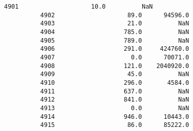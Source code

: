 \documentclass[11pt]{article}
\begin{document}
\begin{Verbatim}[commandchars=\\\{\}]
          4901                    10.0          NaN   
          4902                    89.0      94596.0   
          4903                    21.0          NaN   
          4904                   785.0          NaN   
          4905                   789.0          NaN   
          4906                   291.0     424760.0   
          4907                     0.0      70071.0   
          4908                   121.0    2040920.0   
          4909                    45.0          NaN   
          4910                   296.0       4584.0   
          4911                   637.0          NaN   
          4912                   841.0          NaN   
          4913                     0.0          NaN   
          4914                   946.0      10443.0   
          4915                    86.0      85222.0   
          

\end{Verbatim}
\end{document}

